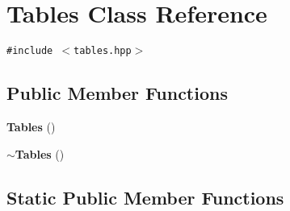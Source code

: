 \section{Tables Class Reference}
\label{classTables}
{\tt \#include $<$tables.hpp$>$}

\subsection*{Public Member Functions}
\begin{CompactItemize}
\item 
{\bf Tables} ()
\item 
{\bf $\sim$Tables} ()
\end{CompactItemize}
\subsection*{Static Public Member Functions}
